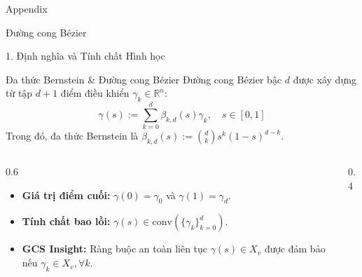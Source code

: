 \documentclass[aspectratio=169]{beamer}
\begin{document}
\begin{frame}{Appendix}
    \begin{center}
        \Huge Đường cong Bézier
    \end{center}
\end{frame}

\begin{frame}{1. Định nghĩa và Tính chất Hình học}
    \begin{block}{Đa thức Bernstein \& Đường cong Bézier}
        Đường cong Bézier bậc $d$ được xây dựng từ tập $d+1$ điểm điều khiển $\gamma_k \in \mathbb{R}^n$:
        \begin{equation*}
            \gamma(s) := \sum_{k=0}^d \beta_{k,d}(s)\gamma_k, \quad s \in [0, 1]
        \end{equation*}
        Trong đó, đa thức Bernstein là $\beta_{k,d}(s) := \binom{d}{k} s^k(1-s)^{d-k}$.
    \end{block}

    \begin{columns}
        \begin{column}{0.6\textwidth}
            \begin{itemize}
                \item \textbf{Giá trị điểm cuối:} $\gamma(0) = \gamma_0$ và $\gamma(1) = \gamma_d$.
                \item \textbf{Tính chất bao lồi:} $\gamma(s) \in \text{conv}(\{\gamma_k\}_{k=0}^d)$.
                \item \textbf{GCS Insight:} Ràng buộc an toàn liên tục $\gamma(s) \in X_v$ được đảm bảo nếu $\gamma_k \in X_v, \forall k$.
            \end{itemize}
        \end{column}
        \begin{column}{0.4\textwidth}
            \centering
        \end{column}
    \end{columns}
\end{frame}
\end{document}
